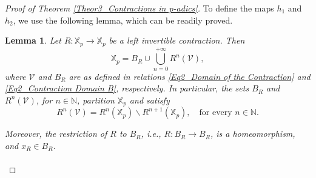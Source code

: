 \documentclass[10pt,a4paper]{amsart}
\newtheorem{lemma}{Lemma}
\begin{document}
\begin{proof}[Proof of Theorem \ref{Theor3_Contractions in p-adics}]
		
		To define the maps $h_{1}$ and $h_{2}$, we use the following lemma, which can be readily proved.   
		
		\begin{lemma}\label{Lem2_Domain of the Contraction}
			Let $R: \mathbb{X}_{p} \to \mathbb{X}_{p}$ be a left invertible contraction. Then 
			\begin{equation}\label{Eq2_Partition Domain}
				\mathbb{X}_{p}   =   B_{R} \cup \bigcup_{n=0}^{+ \infty } R^{n} \left(  \mathcal{V}  \right)  , 
			\end{equation}
			where $ \mathcal{V} $ and $B_{R}$ are as defined in relations \eqref{Eq2_Domain of the Contraction} and \eqref{Eq2_Contraction Domain B}, respectively.
			In particular, the sets $B_{R}$ and $R^{n} \left(  \mathcal{V}  \right) $, for $n \in \mathbb{N} $,  partition $\mathbb{X}_{p}$ and satisfy 
			\begin{equation}\label{Eq2_Partition Domain Explicit}
				R^{n} \left(  \mathcal{V}  \right)    =   R^{n} \left(  \mathbb{X}_{p}  \right)  \backslash R^{n+1} \left(  \mathbb{X}_{p}  \right) , \quad \text{for every }  n \in  \mathbb{N} .  
			\end{equation}
			
			Moreover, the restriction of $R$ to $B_{R}$, i.e., $R: B_{R} \to B_{R}$, is a homeomorphism, and $x_{R} \in B_{R}$. 
			
		\end{lemma}
		
		\paragraph{}
		

\end{proof}
\end{document}
